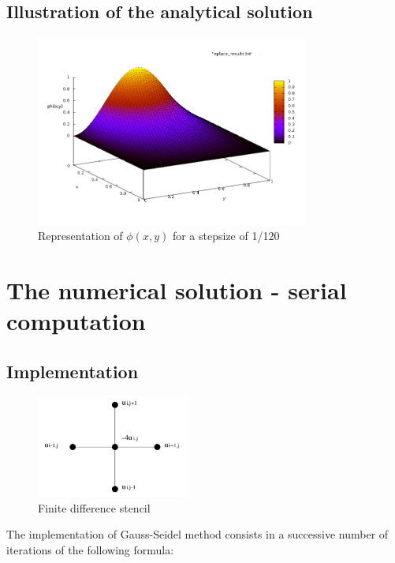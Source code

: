 \documentclass[a4paper,11pt]{article}
\begin{document}
\subsection{Illustration of the analytical solution}

\begin{figure}[h!]
  \centering
  \includegraphics[width=0.8\textwidth]{images/analytical.png}
  \caption{Representation of $\phi(x,y)$ for a stepsize of 1/120}
\end{figure}

\clearpage

\section{The numerical solution - serial computation}
\subsection{Implementation}

\begin{figure}
  \includegraphics[width=0.45\textwidth]{images/gauss-seidel.png}
  \caption{Finite difference stencil}
  \label{fig:stencil}
\end{figure}

The implementation of Gauss-Seidel method consists in a successive number of iterations of the following formula:
\end{document}
